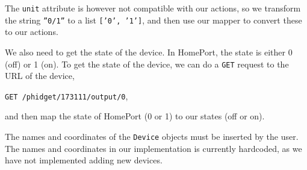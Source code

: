 The \texttt{unit} attribute is however not compatible with our actions, 
so we transform the string \texttt{''0/1''} to a list \texttt{['0', '1']}, 
and then use our mapper to convert these to our actions. 

We also need to get the state of the device. 
In HomePort, the state is either 0 (off) or 1 (on). 
To get the state of the device, 
we can do a \texttt{GET} request to the URL of the device, \eg 
\begin{center}
  \texttt{GET /phidget/173111/output/0},
\end{center}
and then map the state of HomePort (0 or 1) to our states (off or on). 

The names and coordinates of the \texttt{Device} objects must be inserted by the user. 
The names and coordinates in our implementation is currently hardcoded, 
as we have not implemented adding new devices. 

